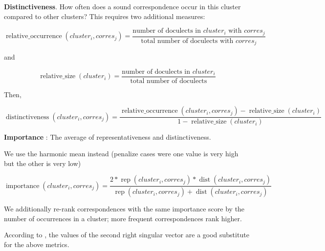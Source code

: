 \documentclass[a4paper]{article}
\begin{document}
\textbf{Distinctiveness}.
How often does a sound correspondence occur in this cluster compared to other clusters? 
This requires two additional measures: 

\begin{equation*}
\operatorname{relative\_occurrence}(cluster_i, corres_j) = 
\frac{\text{number of doculects in } cluster_i \text{ with }  corres_j}
{\text{total number of doculects with } corres_j}
\end{equation*}

and

\begin{equation*}
\operatorname{relative\_size}(cluster_i) = 
\frac{\text{number of doculects in } cluster_i}
{\text{total number of doculects}}
\end{equation*}

Then, 

\begin{equation*}
\operatorname{distinctiveness}(cluster_i, corres_j) = 
\frac{\operatorname{relative\_occurrence}(cluster_i, corres_j) - \operatorname{relative\_size}(cluster_i)}
{1 - \operatorname{relative\_size}(cluster_i)}
\end{equation*}

\textbf{Importance}
\citet{wieling2011bipartite}: 
The average of representativeness and distinctiveness.

We use the harmonic mean instead (penalize cases were one value is very high but the other is very low)

\begin{equation*}
\operatorname{importance}(cluster_i, corres_j) = 
\frac{
2 * \operatorname{rep}(cluster_i, corres_j) * \operatorname{dist}(cluster_i, corres_j)}
{\operatorname{rep}(cluster_i, corres_j) + \operatorname{dist}(cluster_i, corres_j)}
\end{equation*}

We additionally re-rank correspondences with the same importance score by the number of occurrences in a cluster; more frequent correspondences rank higher.


According to \citet{wieling2010hierarchical}, the values of the second right singular vector are a good substitute for the above metrics.
\end{document}
